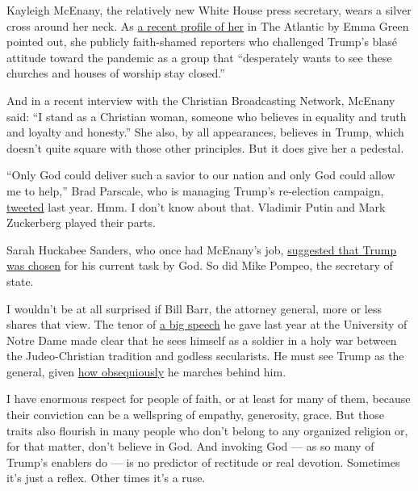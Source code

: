 Kayleigh McEnany, the relatively new White House press secretary, wears
a silver cross around her neck. As
\href{https://www.theatlantic.com/politics/archive/2020/06/kayleigh-mcenany-trump-evangelicals/613471/}{a
recent profile of her} in The Atlantic by Emma Green pointed out, she
publicly faith-shamed reporters who challenged Trump's blasé attitude
toward the pandemic as a group that ``desperately wants to see these
churches and houses of worship stay closed.''

And in a recent interview with the Christian Broadcasting Network,
McEnany said: ``I stand as a Christian woman, someone who believes in
equality and truth and loyalty and honesty.'' She also, by all
appearances, believes in Trump, which doesn't quite square with those
other principles. But it does give her a pedestal.

``Only God could deliver such a savior to our nation and only God could
allow me to help,'' Brad Parscale, who is managing Trump's re-election
campaign,
\href{https://twitter.com/parscale/status/1123212317376811009}{tweeted}
last year. Hmm. I don't know about that. Vladimir Putin and Mark
Zuckerberg played their parts.

Sarah Huckabee Sanders, who once had McEnany's job,
\href{https://www.politico.com/story/2019/04/30/donald-trump-evangelicals-god-1294578}{suggested
that Trump was chosen} for his current task by God. So did Mike Pompeo,
the secretary of state.

I wouldn't be at all surprised if Bill Barr, the attorney general, more
or less shares that view. The tenor of
\href{https://www.justice.gov/opa/speech/attorney-general-william-p-barr-delivers-remarks-law-school-and-de-nicola-center-ethics}{a
big speech} he gave last year at the University of Notre Dame made clear
that he sees himself as a soldier in a holy war between the
Judeo-Christian tradition and godless secularists. He must see Trump as
the general, given
\href{https://www.nytimes.com/2019/12/10/opinion/william-barr-trump.html}{how
obsequiously} he marches behind him.

I have enormous respect for people of faith, or at least for many of
them, because their conviction can be a wellspring of empathy,
generosity, grace. But those traits also flourish in many people who
don't belong to any organized religion or, for that matter, don't
believe in God. And invoking God --- as so many of Trump's enablers do
--- is no predictor of rectitude or real devotion. Sometimes it's just a
reflex. Other times it's a ruse.

